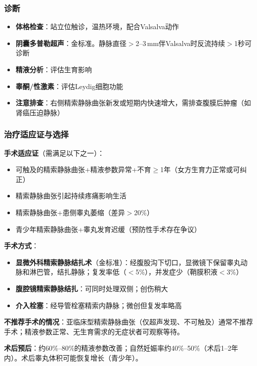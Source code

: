 \subsubsection{诊断}

\begin{itemize}[leftmargin=2cm]
	\item \textbf{体格检查}：站立位触诊，温热环境，配合Valsalva动作
	\item \textbf{阴囊多普勒超声}：金标准。静脉直径$>$2--3\,mm伴Valsalva时反流持续$>$1秒可诊断
	\item \textbf{精液分析}：评估生育影响
	\item \textbf{睾酮/性激素}：评估Leydig细胞功能
	\item \textbf{注意排查}：右侧精索静脉曲张新发或短期内快速增大，需排查腹膜后肿瘤（如肾癌压迫静脉）
\end{itemize}

\subsubsection{治疗适应证与选择}

\textbf{手术适应证}（需满足以下之一）：
\begin{itemize}[leftmargin=2cm]
	\item 可触及的精索静脉曲张+精液参数异常+不育$\ge$1年（女方生育力正常或可纠正）
	\item 精索静脉曲张引起持续疼痛影响生活
	\item 精索静脉曲张+患侧睾丸萎缩（差异$>$20\%）
	\item 青少年精索静脉曲张+睾丸发育迟缓（预防性手术存在争议）
\end{itemize}

\textbf{手术方式}：
\begin{itemize}[leftmargin=2cm]
	\item \textbf{显微外科精索静脉结扎术}（金标准）：经腹股沟下切口，显微镜下保留睾丸动脉和淋巴管，结扎静脉；复发率低（$<$5\%），并发症少（鞘膜积液$<$3\%）
	\item \textbf{腹腔镜精索静脉结扎}：可同时处理双侧；创伤稍大
	\item \textbf{介入栓塞}：经导管栓塞精索内静脉；微创但复发率略高
\end{itemize}

\textbf{不推荐手术的情况}：亚临床型精索静脉曲张（仅超声发现、不可触及）通常不推荐手术；精液参数正常、无生育需求的无症状者可观察等待。

\textbf{术后预后}：约60\%--80\%的精液参数改善；自然妊娠率约40\%--50\%（术后1--2年内）。术后睾丸体积可能恢复增长（青少年）。

